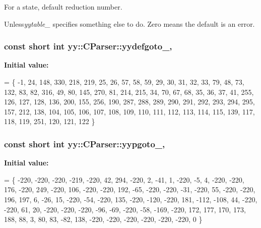 For a state, default reduction number. 

Unless{\itshape yytable\-\_\-} specifies something else to do. Zero means the default is an error. \hypertarget{classyy_1_1CParser_ad0f98d9a4a2ad0b1b1eb97725340d01a}{
\subsubsection[{yydefgoto\-\_\-}]{\setlength{\rightskip}{0pt plus 5cm}const short int yy\-::\-C\-Parser\-::yydefgoto\-\_\-\hspace{0.3cm}{\ttfamily [static]}, {\ttfamily [private]}}}\label{classyy_1_1CParser_ad0f98d9a4a2ad0b1b1eb97725340d01a}
{\bfseries Initial value\-:}
\begin{DoxyCode}
=
  \{
        -1,    24,   148,   330,   218,   219,    25,    26,    57,    58,
      59,    29,    30,    31,    32,    33,    79,    48,    73,   132,
      83,    82,   316,    49,    80,   145,   270,    81,   214,   215,
      34,    70,    67,    68,    35,    36,    37,    41,   255,   126,
     127,   128,   136,   200,   155,   256,   190,   287,   288,   289,
     290,   291,   292,   293,   294,   295,   157,   212,   138,   104,
     105,   106,   107,   108,   109,   110,   111,   112,   113,   114,
     115,   139,   117,   118,   119,   251,   120,   121,   122
  \}
\end{DoxyCode}
\hypertarget{classyy_1_1CParser_a07bec0bd45d834275271e3517c2776c3}{
\subsubsection[{yypgoto\-\_\-}]{\setlength{\rightskip}{0pt plus 5cm}const short int yy\-::\-C\-Parser\-::yypgoto\-\_\-\hspace{0.3cm}{\ttfamily [static]}, {\ttfamily [private]}}}\label{classyy_1_1CParser_a07bec0bd45d834275271e3517c2776c3}
{\bfseries Initial value\-:}
\begin{DoxyCode}
=
  \{
      -220,  -220,  -220,  -219,  -220,    42,   294,  -220,     2,   -41,
       1,  -220,    -5,     4,  -220,  -220,   176,  -220,   249,  -220,
     106,  -220,  -220,   192,   -65,  -220,  -220,   -31,  -220,    55,
    -220,  -220,   196,   197,     6,   -26,    15,  -220,   -54,  -220,
     135,  -220,  -120,  -220,   181,  -112,  -108,    44,  -220,  -220,
      61,    20,  -220,  -220,  -220,   -96,   -69,  -220,   -58,  -169,
    -220,   172,   177,   170,   173,   188,    88,     3,    80,    83,
     -82,   138,  -220,  -220,  -220,  -220,  -220,  -220,     0
  \}
\end{DoxyCode}
